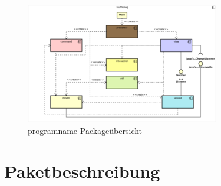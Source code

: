 \begin{figure}[H]
  \centering
  \includegraphics[width=\textwidth]{../diagramimages/trufflehog-component.png}
  \caption{\gls{programname} Packageübersicht}
\end{figure}


\section{Paketbeschreibung}















\medskip

